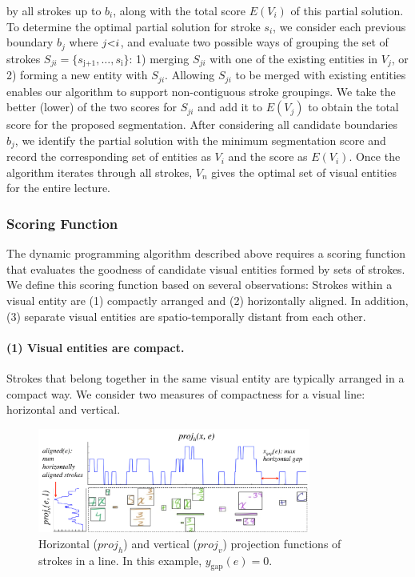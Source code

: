 by all strokes up to $b_i$, along with the total score $E(V_i)$ of
this partial solution.
%
To determine the optimal partial solution for stroke $s_i$, we
consider each previous boundary $b_j$ where
$\setlength{\thickmuskip}{0mu} j<i$, and evaluate two possible ways of
grouping the set of strokes $S_{ji} = \{s_\text{j+1},
\dots,s_\text{i}\}$: 1) merging $S_{ji}$ with one of the existing entities
in $V_j$, or 2) forming a new entity with $S_{ji}$. 
%
Allowing $S_{ji}$ to be merged with existing entities enables our
algorithm to support non-contiguous stroke groupings.
%
We take the better (lower) of the two scores for $S_{ji}$ and add it
to $E(V_j)$ to obtain the total score for the proposed
segmentation. After considering all candidate boundaries $b_j$, we
identify the partial solution with the minimum segmentation score and
record the corresponding set of entities as $V_i$ and the score as $E(V_i)$.
%
Once the algorithm iterates through all strokes, $V_n$ gives the
optimal set of visual entities for the entire lecture.
%
%
\subsubsection{Scoring Function}
The dynamic programming algorithm described above requires a scoring
function that evaluates the goodness of candidate visual entities
formed by sets of strokes. We define this scoring function based on
several observations: Strokes within a visual entity are (1) compactly arranged and (2) horizontally aligned. In addition, (3) separate visual entities are spatio-temporally distant from each other.
%
\paragraph{(1) Visual entities are compact.} Strokes that belong together
in the same visual entity are typically arranged in a compact way. We
consider two measures of compactness for a visual line:
horizontal and vertical.

\begin{figure}[h!]
	\centering
        \includegraphics[width=0.8\textwidth]{figures/projection_function.pdf}
        	\captionsetup{font=footnotesize}
        \caption{Horizontal ($proj_h$) and vertical ($proj_v$) projection functions of strokes in a line. In this example, $y_\text{gap}(e)=0$.}
        \label{Fig:projection_function}
\end{figure}

